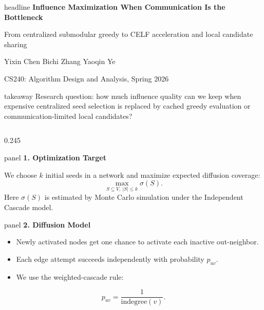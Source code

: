 \documentclass[final]{beamer}
\newcommand{\panel}[2]{%
  \begin{beamercolorbox}[wd=\linewidth,sep=0.32cm,rounded=true]{panel}
    {\color{deepteal}\bfseries\Large #1}\par
    \vspace{0.18cm}
    #2
  \end{beamercolorbox}
}
\begin{document}
\begin{frame}[t]

\begin{beamercolorbox}[wd=\paperwidth,sep=0.62cm]{headline}
  \centering
  {\bfseries\fontsize{37}{43}\selectfont Influence Maximization When Communication Is the Bottleneck}\par
  \vspace{0.22cm}
  {\fontsize{21}{27}\selectfont From centralized submodular greedy to CELF acceleration and local candidate sharing}\par
  \vspace{0.20cm}
  {\fontsize{17}{22}\selectfont Yixin Chen \quad Bichi Zhang \quad Yaoqin Ye}\par
  \vspace{0.08cm}
  {\fontsize{14}{19}\selectfont CS240: Algorithm Design and Analysis, Spring 2026}
\end{beamercolorbox}

\vspace{0.42cm}
\begin{beamercolorbox}[wd=\textwidth,sep=0.34cm,rounded=true]{takeaway}
  \centering
  {\large Research question: how much influence quality can we keep when expensive centralized seed selection is replaced by cached greedy evaluation or communication-limited local candidates?}
\end{beamercolorbox}

\vspace{0.54cm}
\begin{columns}[t,totalwidth=\textwidth]

\begin{column}{0.245\textwidth}
\vspace{0pt}
\panel{1. Optimization Target}{
  We choose \(k\) initial seeds in a network and maximize expected diffusion coverage:
  \[
    \max_{S\subseteq V,\ |S|\le k}\sigma(S).
  \]
  Here \(\sigma(S)\) is estimated by Monte Carlo simulation under the Independent Cascade model.
}

\vspace{0.36cm}
\panel{2. Diffusion Model}{
  \begin{itemize}
    \item Newly activated nodes get one chance to activate each inactive out-neighbor.
    \item Each edge attempt succeeds independently with probability \(p_{uv}\).
    \item We use the weighted-cascade rule:
  \end{itemize}
  \[
    p_{uv}=\frac{1}{\mathrm{indegree}(v)}.
  \]
}


\end{column}
\end{columns}
\end{frame}
\end{document}
